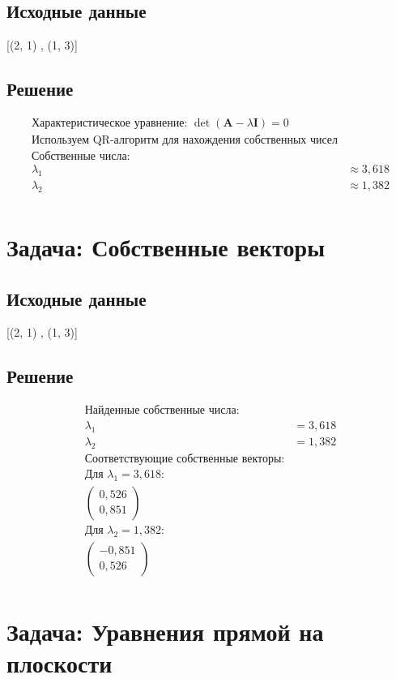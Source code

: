 \documentclass{article}
\begin{document}
\subsection{Исходные данные}
[(2, 1) ,  (1, 3)]
\subsection{Решение}
\begin{align*}
\text{Характеристическое уравнение: } \det(\mathbf{A} - \lambda\mathbf{I}) = 0\\
\text{Используем QR-алгоритм для нахождения собственных чисел}\\
\text{Собственные числа:}\\
\lambda_1 &\approx 3,618\\
\lambda_2 &\approx 1,382\\
\end{align*}
\section{Задача: Собственные векторы}
\subsection{Исходные данные}
[(2, 1) ,  (1, 3)]
\subsection{Решение}
\begin{align*}
\text{Найденные собственные числа:}\\
\lambda_1 &= 3,618\\
\lambda_2 &= 1,382\\
\text{Соответствующие собственные векторы:}\\
\text{Для }\lambda_1 = 3,618:\\
\begin{pmatrix}
0,526 \\ 0,851\end{pmatrix}\\
\text{Для }\lambda_2 = 1,382:\\
\begin{pmatrix}
-0,851 \\ 0,526\end{pmatrix}\\
\end{align*}
\section{Задача: Уравнения прямой на плоскости}
\end{document}
